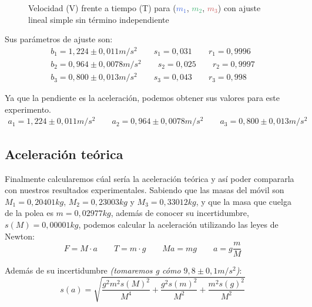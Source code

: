 \documentclass[12pt, a4paper, titlepage]{article}
\begin{document}
  \begin{figure}[H]
    \hspace{-1.8cm} \centering
     

    \hspace{-1.8cm} 

    \caption{Velocidad (V) frente a tiempo (T) para (\textcolor{RoyalBlue}{$m_1$}, \textcolor{MediumSeaGreen}{$m_2$}, \textcolor{IndianRed}{$m_3$}) con ajuste lineal simple sin término independiente}
  \end{figure}

  Sus parámetros de ajuste son:
  \begin{gather*}
    b_1 = 1,224 \pm 0,011 m/s^2 \qquad s_1 = 0,031 \qquad r_1 = 0,9996 \\
    b_2 = 0,964 \pm 0,0078 m/s^2 \qquad s_2 = 0,025 \qquad r_2 = 0,9997 \\
    b_3 = 0,800 \pm 0,013 m/s^2 \qquad s_3 = 0,043 \qquad r_3 = 0,998
  \end{gather*}

  Ya que la pendiente es la aceleración, podemos obtener sus valores para este experimento.
  \begin{gather*}
    a_1 = 1,224 \pm 0,011 m/s^2 \qquad a_2 = 0,964 \pm 0,0078 m/s^2 \qquad a_3 = 0,800 \pm 0,013 m/s^2
  \end{gather*}

  \newpage
  \subsection{Aceleración teórica}

  Finalmente calcularemos cúal sería la aceleración teórica y así poder compararla con nuestros resultados experimentales. Sabiendo que las masas del móvil son $M_1 = 0,20401kg$, $M_2 = 0,23003kg$ y $M_3 = 0,33012kg$, y que la masa que cuelga de la polea es $m = 0,02977 kg$, además de conocer su incertidumbre, $s(M) = 0,00001 kg$, podemos calcular la aceleración utilizando las leyes de Newton:
  \begin{equation}
    F = M \cdot a \qquad T = m \cdot g \qquad Ma = mg \qquad a = g \frac{m}{M} \label{ec:accm}
  \end{equation}

  Además de su incertidumbre \textit{(tomaremos g cómo $9,8 \pm 0,1 m/s^2$)}:
  \begin{equation}
    s(a) = \sqrt{\frac{g^2 m^2 s(M)^2}{M^4} + \frac{g^2 s(m)^2}{M^2} + \frac{m^2 s(g)^2}{M^2}} \label{ec:saccm}
  \end{equation}
\end{document}
